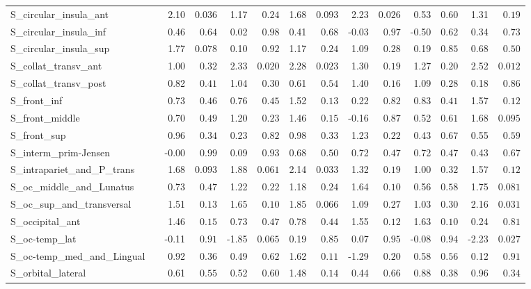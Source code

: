 {\begin{longtable}{llrrrrrrrrrrrr}
S\_circular\_insula\_ant &  & 2.10 & $0.036$ & 1.17 & $0.24$ & 1.68 & $0.093$ & 2.23 & $0.026$ & 0.53 & $0.60$ & 1.31 & $0.19$ \\
S\_circular\_insula\_inf &  & 0.46 & $0.64$ & 0.02 & $0.98$ & 0.41 & $0.68$ & -0.03 & $0.97$ & -0.50 & $0.62$ & 0.34 & $0.73$ \\
S\_circular\_insula\_sup &  & 1.77 & $0.078$ & 0.10 & $0.92$ & 1.17 & $0.24$ & 1.09 & $0.28$ & 0.19 & $0.85$ & 0.68 & $0.50$ \\
S\_collat\_transv\_ant &  & 1.00 & $0.32$ & 2.33 & $0.020$ & 2.28 & $0.023$ & 1.30 & $0.19$ & 1.27 & $0.20$ & 2.52 & $0.012$ \\
S\_collat\_transv\_post &  & 0.82 & $0.41$ & 1.04 & $0.30$ & 0.61 & $0.54$ & 1.40 & $0.16$ & 1.09 & $0.28$ & 0.18 & $0.86$ \\
S\_front\_inf &  & 0.73 & $0.46$ & 0.76 & $0.45$ & 1.52 & $0.13$ & 0.22 & $0.82$ & 0.83 & $0.41$ & 1.57 & $0.12$ \\
S\_front\_middle &  & 0.70 & $0.49$ & 1.20 & $0.23$ & 1.46 & $0.15$ & -0.16 & $0.87$ & 0.52 & $0.61$ & 1.68 & $0.095$ \\
S\_front\_sup &  & 0.96 & $0.34$ & 0.23 & $0.82$ & 0.98 & $0.33$ & 1.23 & $0.22$ & 0.43 & $0.67$ & 0.55 & $0.59$ \\
S\_interm\_prim-Jensen &  & -0.00 & $0.99$ & 0.09 & $0.93$ & 0.68 & $0.50$ & 0.72 & $0.47$ & 0.72 & $0.47$ & 0.43 & $0.67$ \\
S\_intrapariet\_and\_P\_trans &  & 1.68 & $0.093$ & 1.88 & $0.061$ & 2.14 & $0.033$ & 1.32 & $0.19$ & 1.00 & $0.32$ & 1.57 & $0.12$ \\
S\_oc\_middle\_and\_Lunatus &  & 0.73 & $0.47$ & 1.22 & $0.22$ & 1.18 & $0.24$ & 1.64 & $0.10$ & 0.56 & $0.58$ & 1.75 & $0.081$ \\
S\_oc\_sup\_and\_transversal &  & 1.51 & $0.13$ & 1.65 & $0.10$ & 1.85 & $0.066$ & 1.09 & $0.27$ & 1.03 & $0.30$ & 2.16 & $0.031$ \\
S\_occipital\_ant &  & 1.46 & $0.15$ & 0.73 & $0.47$ & 0.78 & $0.44$ & 1.55 & $0.12$ & 1.63 & $0.10$ & 0.24 & $0.81$ \\
S\_oc-temp\_lat &  & -0.11 & $0.91$ & -1.85 & $0.065$ & 0.19 & $0.85$ & 0.07 & $0.95$ & -0.08 & $0.94$ & -2.23 & $0.027$ \\
S\_oc-temp\_med\_and\_Lingual &  & 0.92 & $0.36$ & 0.49 & $0.62$ & 1.62 & $0.11$ & -1.29 & $0.20$ & 0.58 & $0.56$ & 0.12 & $0.91$ \\
S\_orbital\_lateral &  & 0.61 & $0.55$ & 0.52 & $0.60$ & 1.48 & $0.14$ & 0.44 & $0.66$ & 0.88 & $0.38$ & 0.96 & $0.34$ \\

\end{longtable}}
